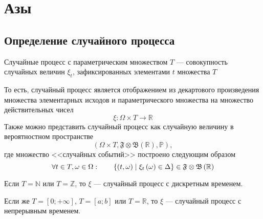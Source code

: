 \chapter{Азы}
\section{Определение случайного процесса}

\begin{definition}
  Случайные процесс с параметрическим множеством $T$ --- совокупность случайных
  величин $\xi_t$, зафиксированных элементами $t$ множества $T$
\end{definition}

То есть, случайный процесс является отображением из декартового произведения
множества элементарных исходов и параметрического множества на множество
действительных чисел
\begin{equation*}
  \xi: \Omega \times T \rightarrow \mathbb{R}
\end{equation*}
Также можно представить случайный процесс как случайную величину в вероятностном
пространстве
\begin{equation*}
  \left( \Omega \times T,
    \mathfrak{F} \otimes \mathfrak{B}\left( \mathbb{R} \right), \mathbb{P}
    \right),
\end{equation*}
где множество <<случайных событий>> построено следующим образом
\begin{equation*}
  \forall t \in T, \omega \in \Omega:\qquad
  \left\{ \left( t, \omega \right) \;\middle|\; \xi_t\left( \omega \right)
      \in \Delta \right\}
    \in \mathfrak{F} \otimes \mathfrak{B}\left( \mathbb{R} \right)
\end{equation*}

\begin{remark}
  Если $T = \mathbb{N}$ или $T = \mathbb{Z}$, то $\xi$ --- случайный процесс с
  дискретным временем.
\end{remark}

\begin{remark}
  Если же $T = \left[ 0; +\infty \right]$, $T = \left[ a; b \right]$ или
  $T = \mathbb{R}$, то $\xi$ --- случайный процесс с непрерывным временем.
\end{remark}

